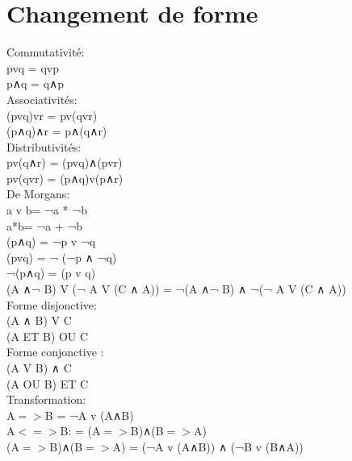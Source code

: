 \section{Changement de forme}
\vspace{5mm} %
Commutativité: \\
pvq = qvp \\
p∧q = q∧p \\

\vspace{5mm} %
Associativités: \\
(pvq)vr = pv(qvr) \\
(p∧q)∧r = p∧(q∧r) \\

\vspace{5mm} %
Distributivités: \\
pv(q∧r) = (pvq)∧(pvr) \\
pv(qvr) = (p∧q)v(p∧r) \\

\vspace{5mm} %
De Morgans: \\
a v b= ¬a * ¬b\\
a*b= ¬a + ¬b\\
(p∧q) = ¬p v ¬q  \\
(pvq) = ¬ (¬p ∧ ¬q)  \\
¬(p∧q) = (p v q)  \\
(A ∧¬ B) V (¬ A V (C ∧ A)) =  ¬(A ∧¬ B) ∧ ¬(¬ A V (C ∧ A))\\

\vspace{5mm} %
Forme disjonctive: \\
(A ∧ B) V C\\
(A ET B) OU C \\

\vspace{5mm} %
Forme conjonctive : \\
(A V B) ∧ C\\
(A OU B) ET C \\

\vspace{5mm} %
Transformation: \\
A$=>$B = ¬A v (A∧B) \\
A$<=>$B: = (A$=>$B)∧(B$=>$A)  \\
(A$=>$B)∧(B$=>$A) = (¬A v (A∧B)) ∧ (¬B v (B∧A))
